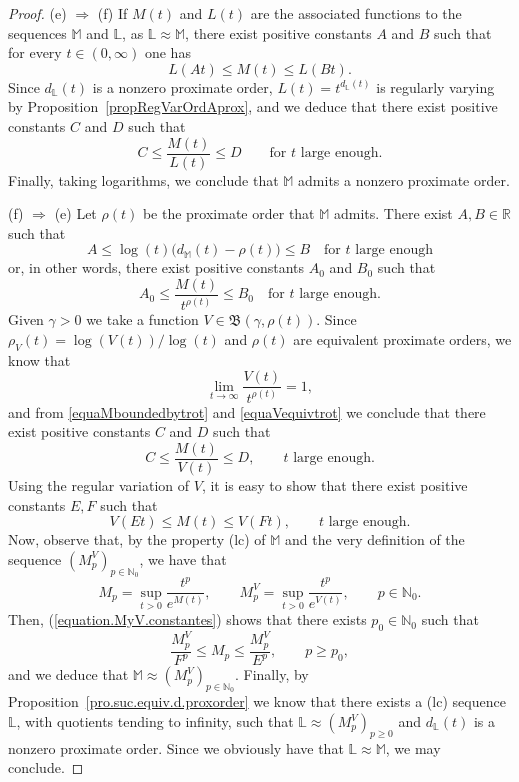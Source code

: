 \documentclass[11pt,a4paper]{article}
\theoremstyle{definition}
\def\oo{\infty}
\def\ga{\gamma}
\def\ro{\rho}
\def\Bet{\mathfrak{B}}
\def\N{\mathbb{N}}
\def\R{\mathbb{R}}
\def\M{\mathbb{M}}
\def\L{\mathbb{L}} %
\begin{document}
\begin{proof}
 (e) $\Rightarrow$ (f)  If $M(t)$ and $L(t)$ are the associated functions to the sequences $\M$ and $\L$, as
 $\L\approx\M$, there exist positive constants $A$ and $B$  such that for every $t\in(0,\oo)$ one has
 $$L(At)\leq M(t)\leq L(Bt).$$
 Since $d_{\L}(t)$ is a nonzero proximate order, $L(t)=t^{d_{\L}(t)}$ is regularly varying by Proposition~\ref{propRegVarOrdAprox}, and we deduce that
 there exist positive constants $C$ and $D$ such that
 $$C \leq \frac{M(t)}{L(t)}\leq D \qquad \textrm{for $t$ large enough}.$$
 Finally, taking logarithms, we conclude that $\M$ admits a nonzero proximate order.

 (f) $\Rightarrow$ (e) Let $\ro(t)$ be the proximate order that $\M$ admits. There exist $A,B\in\R$ such that
 $$
 A\le \log(t)\big(d_{\M}(t)-\ro(t)\big)\le B\quad\textrm{for $t$ large enough}
 $$
or, in other words, there exist positive constants $A_0$ and $B_0$ such that
\begin{equation}\label{equaMboundedbytrot}
A_0\le \frac{M(t)}{t^{\ro(t)}}\le B_0\quad\textrm{for $t$ large enough}.
\end{equation}
Given $\ga>0$ we take a function $V \in \Bet(\ga, \ro(t))$. Since $\ro_V(t)=\log(V(t))/\log(t)$ and $\ro(t)$ are equivalent proximate orders, we know that
\begin{equation}\label{equaVequivtrot}
\lim_{t\to\oo}\frac{V(t)}{t^{\ro(t)}}=1,
\end{equation}
and from \eqref{equaMboundedbytrot} and \eqref{equaVequivtrot} we conclude that there exist positive constants $C$ and $D$ such that
 $$C\leq \frac{M(t)}{V(t)}\leq D, \qquad t\textrm{ large enough}.$$
 Using the regular variation of $V$, it is easy to show that there exist positive constants $E,F$
such that
\begin{equation}\label{equation.MyV.constantes}
 V(Et) \leq M(t)\leq V(Ft), \qquad t\textrm{ large enough}.
\end{equation}
Now, observe that, by the property (lc) of $\M$ and the very definition of the sequence $(M^V_p)_{p\in\N_0}$, we have that
 $$ M_p =\sup_{t>0} \frac{t^p}{e^{M(t)}}, \qquad M^V_p=\sup_{t>0} \frac{t^p}{e^{V(t)}},   \qquad p\in\N_0.$$
Then, (\ref{equation.MyV.constantes}) shows that there exists $p_0\in\N_0$ such that
 $$\frac{M^V_p}{F^p}  \leq M_p\leq \frac{M^V_p}{E^p}, \qquad p\geq p_0,$$
and we deduce that $\M\approx(M^V_p)_{p\in\N_0}$.
Finally, by Proposition~\ref{pro.suc.equiv.d.proxorder} we know that there exists a (lc) sequence $\L$, with quotients tending to infinity, such that $\L\approx(M^V_p)_{p\geq0}$ and $d_{\L}(t)$ is a nonzero proximate order.  Since we obviously have that $\L\approx\M$, we may conclude.
\end{proof}
\end{document}
